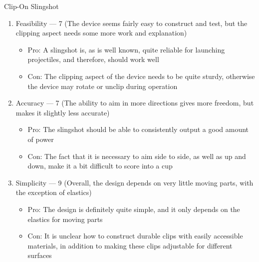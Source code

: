 \begin{center}
  Clip-On Slingshot
\end{center}

\begin{enumerate}

  \item Feasibility — 7 (The device seems fairly easy to construct and test, but the clipping aspect needs some more work and explanation)

    \begin{itemize}

      \item Pro: A slingshot is, as is well known, quite reliable for launching projectiles, and therefore, should work well

      \item Con: The clipping aspect of the device needs to be quite sturdy, otherwise the device may rotate or unclip during operation

    \end{itemize}

  \item Accuracy — 7 (The ability to aim in more directions gives more freedom, but makes it slightly less accurate)

    \begin{itemize}

      \item Pro: The slingshot should be able to consistently output a good amount of power

      \item Con: The fact that it is necessary to aim side to side, as well as up and down, make it a bit difficult to score into a cup

    \end{itemize}

  \item Simplicity — 9 (Overall, the design depends on very little moving parts, with the exception of elastics)

    \begin{itemize}

      \item Pro: The design is definitely quite simple, and it only depends on the elastics for moving parts

      \item Con: It is unclear how to construct durable clips with easily accessible materials, in addition to making these clips adjustable for different surfaces


\end{itemize}
\end{enumerate}
